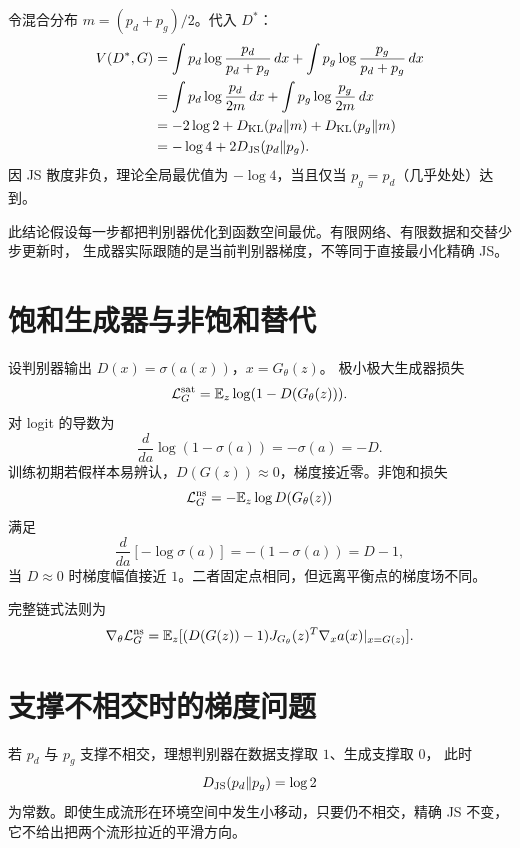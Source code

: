 \documentclass[11pt]{article}
\numberwithin{equation}{section}
\newcommand{\E}{\mathbb{E}}
\newcommand{\1}{\mathbf{1}}
\newcommand{\cL}{\mathcal{L}}
\begin{document}
令混合分布 $m=(p_d+p_g)/2$。代入 $D^*$：
\begin{align}
 V(D^*,G)
 &=\int p_d\log\frac{p_d}{p_d+p_g}\,dx
 +\int p_g\log\frac{p_g}{p_d+p_g}\,dx\\
 &=\int p_d\log\frac{p_d}{2m}\,dx
 +\int p_g\log\frac{p_g}{2m}\,dx\\
 &=-2\log2+D_{\rm KL}(p_d\|m)+D_{\rm KL}(p_g\|m)\\
 &=-\log4+2D_{\rm JS}(p_d\|p_g).
\end{align}
因 JS 散度非负，理论全局最优值为 $-\log4$，当且仅当
$p_g=p_d$（几乎处处）达到。

此结论假设每一步都把判别器优化到函数空间最优。有限网络、有限数据和交替少步更新时，
生成器实际跟随的是当前判别器梯度，不等同于直接最小化精确 JS。

\section{饱和生成器与非饱和替代}

设判别器输出 $D(x)=\sigma(a(x))$，$x=G_\theta(z)$。
极小极大生成器损失
\begin{equation}
 \cL_G^{\rm sat}=\E_z\log(1-D(G_\theta(z))).
\end{equation}
对 logit 的导数为
\begin{equation}
 \frac{d}{da}\log(1-\sigma(a))=-\sigma(a)=-D.
\end{equation}
训练初期若假样本易辨认，$D(G(z))\approx0$，梯度接近零。非饱和损失
\begin{equation}
 \cL_G^{\rm ns}=-\E_z\log D(G_\theta(z))
\end{equation}
满足
\begin{equation}
 \frac{d}{da}[-\log\sigma(a)]=-(1-\sigma(a))=D-1,
\end{equation}
当 $D\approx0$ 时梯度幅值接近 $1$。二者固定点相同，但远离平衡点的梯度场不同。

完整链式法则为
\begin{equation}
 \nabla_\theta\cL_G^{\rm ns}
 =\E_z[(D(G(z))-1)
 J_{G_\theta}(z)^T\nabla_xa(x)|_{x=G(z)}].
\end{equation}

\section{支撑不相交时的梯度问题}

若 $p_d$ 与 $p_g$ 支撑不相交，理想判别器在数据支撑取 $1$、生成支撑取 $0$，
此时
\begin{equation}
 D_{\rm JS}(p_d\|p_g)=\log2
\end{equation}
为常数。即使生成流形在环境空间中发生小移动，只要仍不相交，精确 JS 不变，
它不给出把两个流形拉近的平滑方向。
\end{document}
